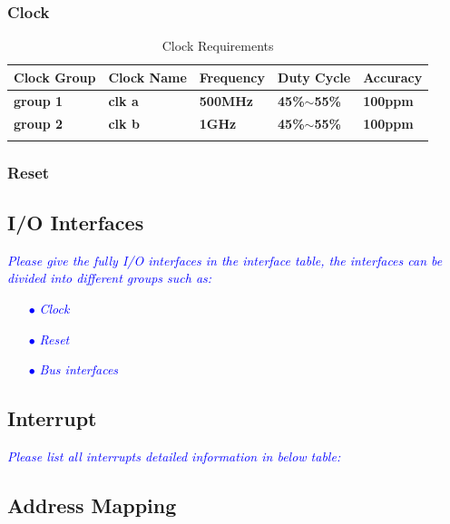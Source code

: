 \subsubsection{Clock}
\begin{table}[hp]
    \centering
    \begin{tabularx}{\textwidth}{|X|X|X|X|X|}
    \hline
    \rowcolor[HTML]{009901} 
    {\color[HTML]{343434} \textbf{Clock Group}} & {\color[HTML]{343434} \textbf{Clock Name}} & {\color[HTML]{343434} \textbf{Frequency}} & {\color[HTML]{343434} \textbf{Duty Cycle}}     & {\color[HTML]{343434} \textbf{Accuracy}} \\ \hline
    {\color[HTML]{329A9D} \textbf{group 1}}     & {\color[HTML]{329A9D} \textbf{clk a}}      & {\color[HTML]{329A9D} \textbf{500MHz}}    & {\color[HTML]{329A9D} \textbf{45\%$\sim$55\%}} & {\color[HTML]{329A9D} \textbf{100ppm}}   \\ \hline
    {\color[HTML]{329A9D} \textbf{group 2}}     & {\color[HTML]{329A9D} \textbf{clk b}}      & {\color[HTML]{329A9D} \textbf{1GHz}}      & {\color[HTML]{329A9D} \textbf{45\%$\sim$55\%}} & {\color[HTML]{329A9D} \textbf{100ppm}}   \\ \hline
    {\color[HTML]{329A9D} \textbf{}}            & {\color[HTML]{329A9D} \textbf{}}           & {\color[HTML]{329A9D} \textbf{}}          & {\color[HTML]{329A9D} \textbf{}}               & {\color[HTML]{329A9D} \textbf{}}         \\ \hline
    \end{tabularx}
    \caption{Clock Requirements}
    \end{table}

\subsubsection{Reset}

\subsection{I/O Interfaces}

\noindent\textit{\textcolor{blue}{Please give the fully I/O interfaces in the interface table, the interfaces can be divided into different groups such as:}}
\begin{itemize}
    \item[\textcolor{blue}{$\bullet$}] \noindent\textit{\textcolor{blue}{Clock}}
    \item[\textcolor{blue}{$\bullet$}] \noindent\textit{\textcolor{blue}{Reset}}
    \item[\textcolor{blue}{$\bullet$}] \noindent\textit{\textcolor{blue}{Bus interfaces}}
\end{itemize}

\subsection{Interrupt}
\noindent\textit{\textcolor{blue}{Please list all interrupts detailed information in below table:}}

\subsection{Address Mapping}

